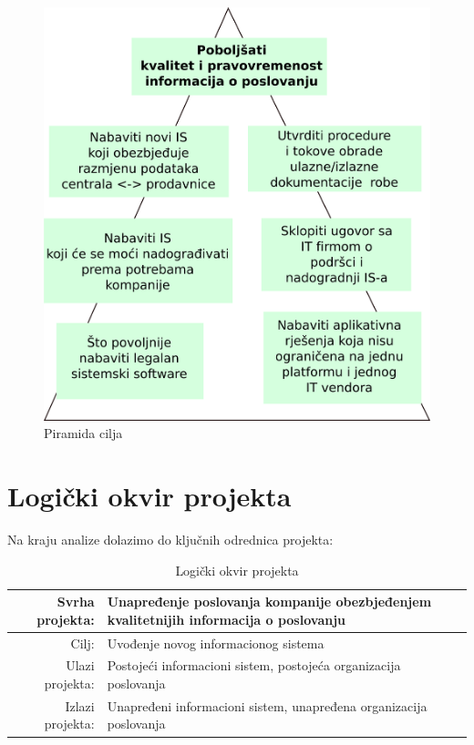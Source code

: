\documentclass[times, utf8, seminar]{fit}
\begin{document}
\begin{figure}[H]
\centering
\includegraphics[width=12cm]{img/piramida_cilja.png}
\caption{Piramida cilja}
\end{figure}

\section{Logički okvir projekta}
Na kraju analize dolazimo do ključnih odrednica projekta:
\begin{table}[h]
\resizebox{15cm}{!} {
\begin{tabular}{ | r | l | }
\hline
Svrha projekta: & Unapređenje poslovanja kompanije obezbjeđenjem kvalitetnijih informacija o poslovanju \\ \hline
Cilj: & Uvođenje novog informacionog sistema \\ \hline
Ulazi projekta: & Postojeći informacioni sistem, postojeća organizacija poslovanja \\ \hline
Izlazi projekta: & Unapređeni informacioni sistem, unapređena organizacija poslovanja \\ \hline
\end{tabular}
}

\caption{Logički okvir projekta}
\end{table}


\label{tab:myfirsttable}
\label{labela_oznaka}
\end{document}
